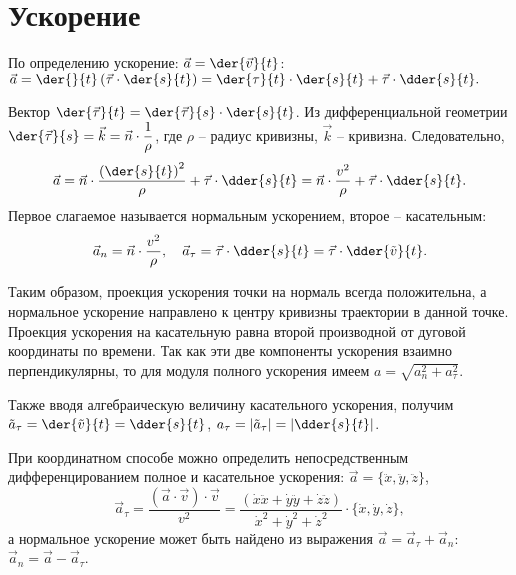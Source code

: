 \section{Ускорение}

По определению ускорение: \( \ds \vec{a} = \der{\vec{v}}{t} \):
\( \ds
    \vec{a} = \der{}{t}\left(\vec{\tau}\cdot\der{s}{t}\right) = \der{\tau}{t}
    \cdot\der{s}{t} + \vec{\tau}\cdot\dder{s}{t}.
\)

Вектор \( \ds \der{\vec{\tau}}{t} = \der{\vec{\tau}}{s}\cdot\der{s}{t} \). Из
дифференциальной геометрии \( \ds \der{\vec{\tau}}{s} = \vec{k} =
\vec{n}\cdot\frac{1}{\rho} \), где \( \rho \) -- радиус кривизны,
\( \vec{k} \) -- кривизна. Следовательно,
\[
    \vec{a} = \vec{n}\cdot\frac{\left(\der{s}{t}\right)^2}{\rho} + \vec{\tau}
    \cdot\dder{s}{t} = \vec{n}\cdot\frac{v^2}{\rho}+ \vec{\tau}\cdot\dder{s}{t}.
\]
Первое слагаемое называется нормальным ускорением, второе -- касательным:
\[
    \vec{a}_n = \vec{n}\cdot\frac{v^2}{\rho}, \quad \vec{a}_\tau =
    \vec{\tau}\cdot\dder{s}{t} = \vec{\tau}\cdot\dder{\tilde{v}}{t}.
\]

Таким образом, проекция ускорения точки на нормаль всегда положительна, а
нормальное ускорение направлено к центру кривизны траектории в данной точке.
Проекция ускорения на касательную равна второй производной от дуговой координаты
по времени. Так как эти две компоненты ускорения взаимно перпендикулярны, то для
модуля полного ускорения имеем \( a = \sqrt{a_n^2 + a_\tau^2} \).

Также вводя алгебраическую величину касательного ускорения, получим
\( \ds \tilde{a}_\tau = \der{\tilde{v}}{t} = \dder{s}{t} \),
\( \ds a_\tau = |\tilde{a}_\tau| = \left|\dder{s}{t}\right| \).

При координатном способе можно определить непосредственным дифференцированием
полное и касательное ускорения: \( \vec{a} = \bigl\{ \ddot{x}, \ddot{y},
\ddot{z}\bigr\} \),
\[
    \vec{a}_\tau = \frac{(\vec{a}\cdot\vec{v})\cdot\vec{v}}{v^2} = \frac{(
    \dot{x}\ddot{x} + \dot{y}\ddot{y} + \dot{z}\ddot{z})}{\dot{x}^2 + \dot{y}^2
    + \dot{z}^2}\cdot\bigl\{\dot{x}, \dot{y}, \dot{z}\bigr\},
\]
а нормальное ускорение может быть найдено из выражения \( \vec{a} = \vec{a}_\tau
+ \vec{a}_n \): \( \vec{a}_n = \vec{a} - \vec{a}_\tau \).

\newpage
